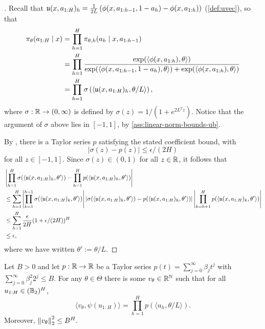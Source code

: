 \begin{proof}[]
Recall that $\mathfrak{u}(x,a_{1:H})_h = \frac{1}{2L}\left(\phi(x,a_{1:h-1},1-a_h) - \phi(x,a_{1:h})\right)$ (\cref{def:uvec}), so that
\begin{align}
\pi_\theta(a_{1:H}\mid{}x)
&= \prod_{h=1}^H \pi_{\theta,h}(a_h\mid{}x,a_{1:h-1}) \\ 
&= \prod_{h=1}^H \frac{\exp(\langle \phi(x,a_{1:h}),\theta\rangle)}{\exp(\langle \phi(x,a_{1:h-1},1-a_h),\theta\rangle) + \exp(\langle \phi(x,a_{1:h}),\theta\rangle)} \\
&= \prod_{h=1}^H \sigma\left(\left\langle \mathfrak{u}(x,a_{1:H})_h, \theta/L\right\rangle\right),
\end{align}
where $\sigma: \mathbb{R} \to (0,\infty)$ is defined by $\sigma(z) = 1/(1 + e^{2L^2 z})$. Notice that the argument of $\sigma$ above lies in $[-1,1]$, by \cref{ass:linear-norm-bounds-ub}.

By \cite[Lemma 2.5]{shalev2011learning}, there is a Taylor series $p$ satisfying the stated coefficient bound, with 
\[|\sigma(z) - p(z)| \leq \epsilon/(2H)\]
for all $z \in [-1,1]$. Since $\sigma(z) \in (0,1)$ for all $z \in \mathbb{R}$, it follows that
\begin{align} 
&\left|\prod_{h=1}^H \sigma(\langle \mathfrak{u}(x,a_{1:H})_h, \theta'\rangle) - \prod_{h=1}^H p(\langle \mathfrak{u}(x,a_{1:H})_h, \theta'\rangle)\right| \\
&\leq 
\sum_{h=1}^H \left|\prod_{k=1}^{h-1} \sigma(\langle \mathfrak{u}(x,a_{1:H})_k, \theta'\rangle)\right| |\sigma(\langle \mathfrak{u}(x,a_{1:H})_h, \theta'\rangle) - p(\langle \mathfrak{u}(x,a_{1:H})_h, \theta'\rangle)| \left|\prod_{k=h+1}^H p(\langle \mathfrak{u}(x,a_{1:H})_k, \theta'\rangle)\right| \\ 
&\leq \sum_{h=1}^H \frac{\epsilon}{2H} (1 + \epsilon/(2H))^H \\ 
&\leq \epsilon,
\end{align}
where we have written $\theta' := \theta/L$.
\end{proof}

\begin{lemma}\label{lemma:poly-to-rkhs}
Let $B>0$ and let $p: \mathbb{R} \to \mathbb{R}$ be a Taylor series $p(t) = \sum_{j=0}^\infty \beta_j t^j$ with $\sum_{j=0}^\infty \beta_j^2 2^j \leq B$. For any $\theta \in \Theta$ there is some $v_\theta \in \mathbb{R}^{\mathbb{N}}$ such that for all $u_{1:H} \in (\mathbb{B}_2)^H$,
\[\langle v_\theta,\psi(u_{1:H})\rangle = \prod_{h=1}^H p(\langle u_h, \theta/L\rangle).\]
Moreover, $\left \lVert v_\theta \right \rVert_2^2 \leq B^H.$
\end{lemma}

